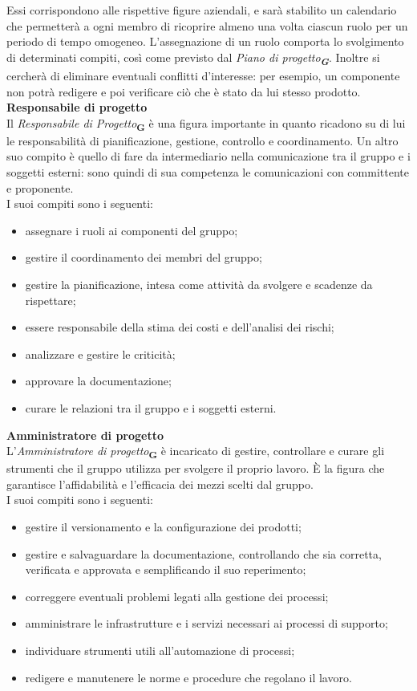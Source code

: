Essi corrispondono alle rispettive figure aziendali, e sarà stabilito un calendario che permetterà a ogni membro di ricoprire almeno una volta ciascun ruolo per un periodo di tempo omogeneo. L'assegnazione di un ruolo comporta lo svolgimento di determinati compiti, così come previsto dal \textit{Piano di progetto\textsubscript{\textbf{G}}}. Inoltre si cercherà di eliminare eventuali conflitti d'interesse: per esempio, un componente non potrà redigere e poi verificare ciò che è stato da lui stesso prodotto.
\textbf{Responsabile di progetto}\\
Il \textit{Responsabile di Progetto}\textsubscript{\textbf{G}} è una figura importante in quanto ricadono su di lui le responsabilità di pianificazione, gestione, controllo e coordinamento. Un altro suo compito è quello di fare da intermediario nella comunicazione tra il gruppo e i soggetti esterni: sono quindi di sua competenza le comunicazioni con committente e proponente.\\
I suoi compiti sono i seguenti:
\begin{itemize}
    \item assegnare i ruoli ai componenti del gruppo;
    \item gestire il coordinamento dei membri del gruppo;
    \item gestire la pianificazione, intesa come attività da svolgere e scadenze da rispettare;
    \item essere responsabile della stima dei costi e dell'analisi dei rischi;
    \item analizzare e gestire le criticità;
    \item approvare la documentazione;
    \item curare le relazioni tra il gruppo e i soggetti esterni.
\end{itemize}
\textbf{Amministratore di progetto}\\
L’\textit{Amministratore di progetto}\textsubscript{\textbf{G}} è incaricato di gestire, controllare e curare gli strumenti che il gruppo utilizza per svolgere il proprio lavoro. È la figura che garantisce l'affidabilità e l'efficacia dei mezzi scelti dal gruppo.\\
I suoi compiti sono i seguenti:
\begin{itemize}
    \item gestire il versionamento e la configurazione dei prodotti;
    \item gestire e salvaguardare la documentazione, controllando che sia corretta, verificata e approvata e semplificando il suo reperimento;
    \item correggere eventuali problemi legati alla gestione dei processi;
    \item amministrare le infrastrutture e i servizi necessari ai processi di supporto;
    \item individuare strumenti utili all'automazione di processi;
    \item redigere e manutenere le norme e procedure che regolano il lavoro.
\end{itemize}
